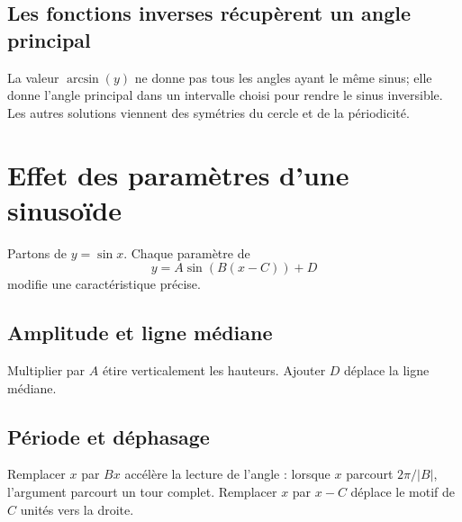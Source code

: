 \documentclass[12pt,a4paper,openany]{book}
\begin{document}
\subsection{Les fonctions inverses récupèrent un angle principal}
La valeur $\arcsin(y)$ ne donne pas tous les angles ayant le même sinus; elle donne l'angle principal dans un intervalle choisi pour rendre le sinus inversible. Les autres solutions viennent des symétries du cercle et de la périodicité.


\section{Effet des paramètres d'une sinusoïde}

Partons de $y=\sin x$. Chaque paramètre de
\[
y=A\sin(B(x-C))+D
\]
modifie une caractéristique précise.

\subsection{Amplitude et ligne médiane}
Multiplier par $A$ étire verticalement les hauteurs. Ajouter $D$ déplace la ligne médiane.

\begin{center}
\qquad
{}
\end{center}

\subsection{Période et déphasage}
Remplacer $x$ par $Bx$ accélère la lecture de l'angle : lorsque $x$ parcourt $2\pi/|B|$, l'argument parcourt un tour complet. Remplacer $x$ par $x-C$ déplace le motif de $C$ unités vers la droite.
\end{document}

